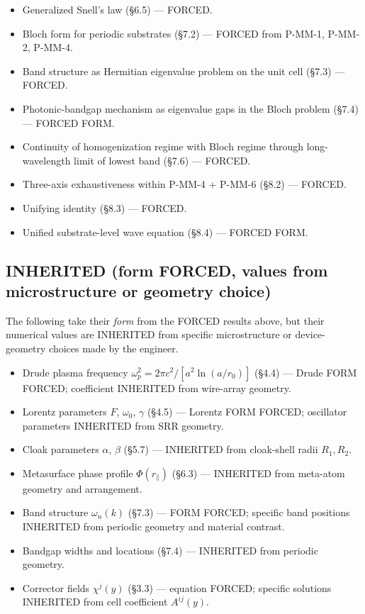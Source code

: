 \documentclass[11pt,a4paper]{article}
\begin{document}
\begin{itemize}[noitemsep]
\item Generalized Snell's law (\S6.5) --- FORCED.
\item Bloch form for periodic substrates (\S7.2) --- FORCED from P-MM-1, P-MM-2, P-MM-4.
\item Band structure as Hermitian eigenvalue problem on the unit cell (\S7.3) --- FORCED.
\item Photonic-bandgap mechanism as eigenvalue gaps in the Bloch problem (\S7.4) --- FORCED FORM.
\item Continuity of homogenization regime with Bloch regime through long-wavelength limit of lowest band (\S7.6) --- FORCED.
\item Three-axis exhaustiveness within P-MM-4 + P-MM-6 (\S8.2) --- FORCED.
\item Unifying identity (\S8.3) --- FORCED.
\item Unified substrate-level wave equation (\S8.4) --- FORCED FORM.
\end{itemize}

\subsection{INHERITED (form FORCED, values from microstructure or geometry choice)}

The following take their \emph{form} from the FORCED results above, but their numerical values are INHERITED from specific microstructure or device-geometry choices made by the engineer.

\begin{itemize}[noitemsep]
\item Drude plasma frequency $\omega_p^2 = 2\pi c^2/[a^2\ln(a/r_0)]$ (\S4.4) --- Drude FORM FORCED; coefficient INHERITED from wire-array geometry.
\item Lorentz parameters $F$, $\omega_0$, $\gamma$ (\S4.5) --- Lorentz FORM FORCED; oscillator parameters INHERITED from SRR geometry.
\item Cloak parameters $\alpha$, $\beta$ (\S5.7) --- INHERITED from cloak-shell radii $R_1, R_2$.
\item Metasurface phase profile $\Phi(r_\parallel)$ (\S6.3) --- INHERITED from meta-atom geometry and arrangement.
\item Band structure $\omega_n(k)$ (\S7.3) --- FORM FORCED; specific band positions INHERITED from periodic geometry and material contrast.
\item Bandgap widths and locations (\S7.4) --- INHERITED from periodic geometry.
\item Corrector fields $\chi^j(y)$ (\S3.3) --- equation FORCED; specific solutions INHERITED from cell coefficient $A^{ij}(y)$.
\end{itemize}
\end{document}
